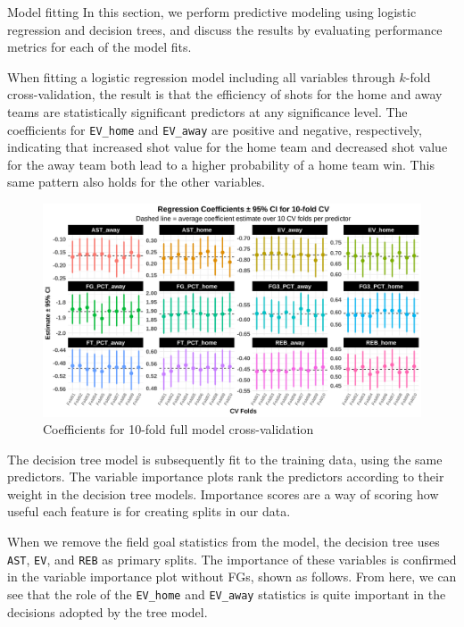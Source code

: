 \documentclass[
  ignorenonframetext,
]{beamer}
\begin{document}
\begin{frame}[fragile]{Model fitting}
\protect\hypertarget{model-fitting}{}
In this section, we perform predictive modeling using logistic
regression and decision trees, and discuss the results by evaluating
performance metrics for each of the model fits.

When fitting a logistic regression model including all variables through
\(k\)-fold cross-validation, the result is that the efficiency of shots
for the home and away teams are statistically significant predictors at
any significance level. The coefficients for \texttt{EV\_home} and
\texttt{EV\_away} are positive and negative, respectively, indicating
that increased shot value for the home team and decreased shot value for
the away team both lead to a higher probability of a home team win. This
same pattern also holds for the other variables.
\end{frame}

\begin{frame}
\begin{figure}

{\centering \includegraphics[width=1\linewidth]{latex/plotspres/plot_11} 

}

\caption{Coefficients for 10-fold full model cross-validation}\label{fig:regcoeffs}
\end{figure}
\end{frame}

\begin{frame}[fragile]
The decision tree model is subsequently fit to the training data, using
the same predictors. The variable importance plots rank the predictors
according to their weight in the decision tree models. Importance scores
are a way of scoring how useful each feature is for creating splits in
our data.

When we remove the field goal statistics from the model, the decision
tree uses \texttt{AST}, \texttt{EV}, and \texttt{REB} as primary splits.
The importance of these variables is confirmed in the variable
importance plot without FGs, shown as follows. From here, we can see
that the role of the \texttt{EV\_home} and \texttt{EV\_away} statistics
is quite important in the decisions adopted by the tree model.
\end{frame}
\end{document}
